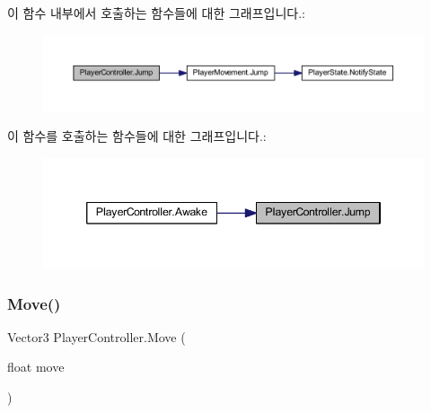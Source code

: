 \begin{DoxyCode}{0}

\end{DoxyCode}
이 함수 내부에서 호출하는 함수들에 대한 그래프입니다.\+:\nopagebreak
\begin{figure}[H]
\begin{center}
\leavevmode
\includegraphics[width=350pt]{dc/dde/class_player_controller_a8a7010cb6f3c524737be3f6f77553df9_cgraph}
\end{center}
\end{figure}
이 함수를 호출하는 함수들에 대한 그래프입니다.\+:\nopagebreak
\begin{figure}[H]
\begin{center}
\leavevmode
\includegraphics[width=346pt]{dc/dde/class_player_controller_a8a7010cb6f3c524737be3f6f77553df9_icgraph}
\end{center}
\end{figure}
\mbox{\label{class_player_controller_a50157884365897164379b8bad7ee4722}} 
\subsubsection{\texorpdfstring{Move()}{Move()}}
{\footnotesize\ttfamily Vector3 Player\+Controller.\+Move (\begin{DoxyParamCaption}\item[{float}]{move }\end{DoxyParamCaption})}



